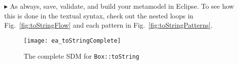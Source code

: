 \begin{itemize}
\item[$\blacktriangleright$] As always, save, validate, and build your metamodel in Eclipse. To see how this is done in the
textual syntax, check out the nested loops in Fig.~\ref{fig:toStringFlow} and each pattern in Fig.~\ref{fig:toStringPatterns}.

\newpage

\vspace*{2cm}

\begin{figure}[htbp]
\begin{center}
  \texttt{[image: ea\_toStringComplete]}
  \caption{The complete SDM for \texttt{Box::toString}}  
  \label{fig:sdm_tostring_5}
\end{center}
\end{figure}
\FloatBarrier


\end{itemize}

